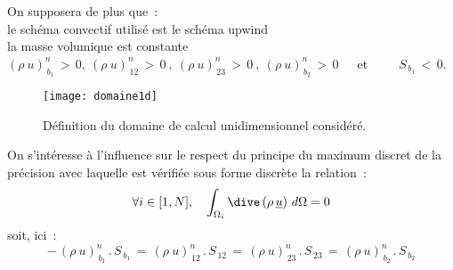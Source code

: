 On supposera de plus que~:\\
\hspace*{1cm}{\tiny$\bigstar$} le schéma convectif utilisé est le schéma upwind\\
\hspace*{1cm}{\tiny$\bigstar$} la masse volumique est constante\\
\hspace*{1cm}{\tiny$\bigstar$} $(\rho\ u)^n_{\,b_1}\,>\,0,\ (\rho\ u)^n_{\,12}\,>\,0\ ,\
(\rho\ u)^n_{\,23}\,>\, 0\ ,\ (\rho\ u)^n_{\,b_2}\,>\,0$\ \ \
et\ \ \ \ \ $S_{\,b_1}\,<\,0$.

\begin{figure}[htp]
\centerline{\texttt{[image: domaine1d]}}
\caption{\label{Base_Covofi_domaine1d_fig}Définition du domaine de calcul unidimensionnel
considéré.}
\end{figure}


On s'intéresse à l'influence sur le respect du principe du maximum discret
de la précision avec laquelle est vérifiée sous forme discrète la
relation~:
$$\forall i \in [1,N],\ \ \ \displaystyle\int_{\Omega_i}\dive\,(\rho\,\underline{u})\ d\Omega = 0$$
soit, ici~:
\begin{equation}
\label{Base_Covofi_ContinuiteDiscreteExemple}
-\,(\rho\ u)^n_{\,b_1}\,.\,S_{\,b_1}\,=\,(\rho\ u)^n_{\,12}\,.\,S_{\,12}\,
=\,(\rho\ u)^n_{\,23}\,.\,S_{\,23}\,=\,(\rho\ u)^n_{\,b_2}\,.\,S_{\,b_2}
\end{equation}

